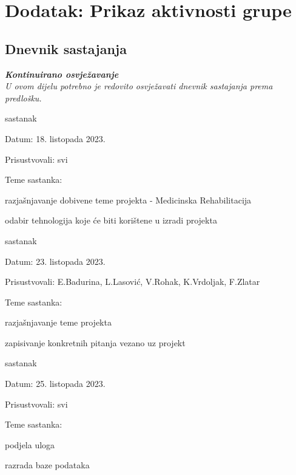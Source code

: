 \chapter*{Dodatak: Prikaz aktivnosti grupe}
		
		\section*{Dnevnik sastajanja}
		
		\textbf{\textit{Kontinuirano osvježavanje}}\\
		
		 \textit{U ovom dijelu potrebno je redovito osvježavati dnevnik sastajanja prema predlošku.}
		
		\begin{packed_enum}
			\item  sastanak			
			\item[] \begin{packed_item}
				\item Datum: 18. listopada 2023.
				\item Prisustvovali: svi
				\item Teme sastanka:
				\begin{packed_item}
					\item  razjašnjavanje dobivene teme projekta - Medicinska Rehabilitacija
					\item  odabir tehnologija koje će biti korištene u izradi projekta
				\end{packed_item}
			\end{packed_item}
			
			\item  sastanak
			\item[] \begin{packed_item}
				\item Datum: 23. listopada 2023.
				\item Prisustvovali: E.Badurina, L.Lasović, V.Rohak, K.Vrdoljak, F.Zlatar
				\item Teme sastanka:
				\begin{packed_item}
					\item  razjašnjavanje teme projekta
					\item  zapisivanje konkretnih pitanja vezano uz projekt
				\end{packed_item}
			\end{packed_item}
			
			\item  sastanak			
			\item[] \begin{packed_item}
				\item Datum: 25. listopada 2023.
				\item Prisustvovali: svi
				\item Teme sastanka:
				\begin{packed_item}
					\item  podjela uloga
					\item  razrada baze podataka
				\end{packed_item}
			\end{packed_item}
			

\end{packed_enum}
